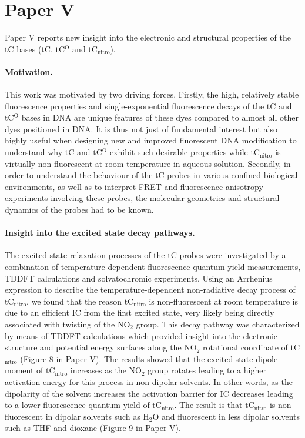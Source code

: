 \section{Paper V}
 Paper V reports new insight into the electronic and structural properties of the tC bases (tC, tC$^\mathrm{O}$ and tC$_\mathrm{nitro}$).

 \paragraph{Motivation.} This work was motivated by two driving forces. Firstly, the high, relatively stable fluorescence properties and single-exponential fluorescence decays of the tC and tC$^\mathrm{O}$ bases in DNA are unique features of these dyes compared to almost all other dyes positioned in DNA. It is thus not just of fundamental interest but also highly useful when designing new and improved fluorescent DNA modification to understand why tC and tC$^\mathrm{O}$ exhibit such desirable properties while tC$_\mathrm{nitro}$ is virtually non-fluorescent at room temperature in aqueous solution. Secondly, in order to understand the behaviour of the tC probes in various confined biological environments, as well as to interpret FRET and fluorescence anisotropy experiments involving these probes, the molecular geometries and structural dynamics of the probes had to be known.

 \paragraph{Insight into the excited state decay pathways.} The excited state relaxation processes of the tC probes were investigated by a combination of temperature-dependent fluorescence quantum yield measurements, TDDFT calculations and solvatochromic experiments.
 Using an Arrhenius expression to describe the temperature-dependent non-radiative decay process of tC$_\mathrm{nitro}$, we found that the reason tC$_\mathrm{nitro}$ is non-fluorescent at room temperature is due to an efficient IC from the first excited state, very likely being directly associated with twisting of the NO$_2$ group. This decay pathway was characterized by means of TDDFT calculations which provided insight into the electronic structure and potential energy surfaces along the NO$_2$ rotational coordinate of tC$_\mathrm{nitro}$ (Figure 8 in Paper V). The results showed that the excited state dipole moment of tC$_\mathrm{nitro}$ increases as the NO$_\mathrm{2}$ group rotates leading to a higher activation energy for this process in non-dipolar solvents. In other words, as the dipolarity of the solvent increases the activation barrier for IC decreases leading to a lower fluorescence quantum yield of tC$_\mathrm{nitro}$. The result is that tC$_\mathrm{nitro}$ is non-fluorescent in dipolar solvents such as H$_2$O and fluorescent in less dipolar solvents such as THF and dioxane (Figure 9 in Paper V).


